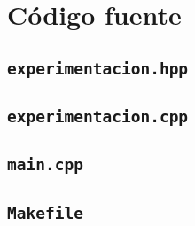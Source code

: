 \appendix

\chapter{C\'odigo fuente}
\label{ch:src-code}

\section{\texttt{experimentacion.hpp}}


\section{\texttt{experimentacion.cpp}}


\section{\texttt{main.cpp}}


\section{\texttt{Makefile}}

